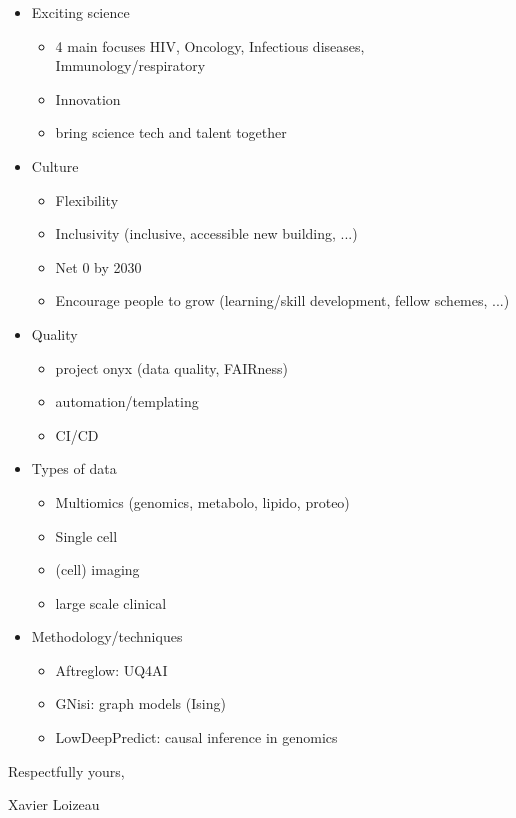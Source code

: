 \documentclass[12pt]{article}
\begin{document}
\begin{itemize}
    \item Exciting science
    \begin{itemize}
        \item 4 main focuses HIV, Oncology, Infectious diseases, Immunology/respiratory
        \item Innovation
        \item bring science tech and talent together
    \end{itemize}
    \item Culture
    \begin{itemize}
        \item Flexibility
        \item Inclusivity (inclusive, accessible new building, ...)
        \item Net 0 by 2030
        \item Encourage people to grow (learning/skill development, fellow schemes, ...)
    \end{itemize}
    \item Quality
    \begin{itemize}
        \item project onyx (data quality, FAIRness)
        \item automation/templating
        \item CI/CD
    \end{itemize}
    \item Types of data
    \begin{itemize}
        \item Multiomics (genomics, metabolo, lipido, proteo)
        \item Single cell
        \item (cell) imaging
        \item large scale clinical
    \end{itemize}
    \item Methodology/techniques
    \begin{itemize}
        \item Aftreglow: UQ4AI
        \item GNisi: graph models (Ising)
        \item LowDeepPredict: causal inference in genomics
    \end{itemize}    
\end{itemize}

\medskip

Respectfully yours,

Xavier Loizeau

\vfill%
\end{document}
